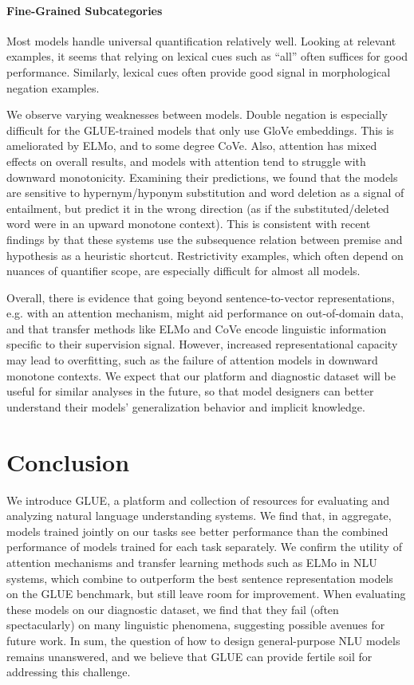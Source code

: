 \paragraph{Fine-Grained Subcategories}

Most models handle universal quantification relatively well.
Looking at relevant examples, it seems that relying on lexical cues such as ``all'' often suffices for good performance.
Similarly, lexical cues often provide good signal in morphological negation examples.

We observe varying weaknesses between models.
Double negation is especially difficult for the GLUE-trained models that only use GloVe embeddings. 
This is ameliorated by ELMo, and to some degree CoVe.
Also, attention has mixed effects on overall results, and models with attention tend to struggle with downward monotonicity.
Examining their predictions, we found that the models are sensitive to hypernym/hyponym substitution and word deletion as a signal of entailment, but predict it in the wrong direction (as if the substituted/deleted word were in an upward monotone context).
This is consistent with recent findings by \citet{mccoy2019subsequence} that these systems use the subsequence relation between premise and hypothesis as a heuristic shortcut.
Restrictivity examples, which often depend on nuances of quantifier scope, are especially difficult for almost all models.

Overall, there is evidence that going beyond sentence-to-vector representations, e.g. with an attention mechanism, might aid performance on out-of-domain data, and that transfer methods like ELMo and CoVe encode linguistic information specific to their supervision signal.
However, increased representational capacity may lead to overfitting, such as the failure of attention models in downward monotone contexts.
We expect that our platform and diagnostic dataset will be useful for similar analyses in the future, so that model designers can better understand their models' generalization behavior and implicit knowledge. 

\section{Conclusion}\label{sec:conclusion}

We introduce GLUE, 
a platform and collection of resources for evaluating and analyzing natural language understanding systems. 
We find that, in aggregate, models trained jointly on our tasks see better performance than the combined performance of models trained for each task separately.
We confirm the utility of attention mechanisms and transfer learning methods such as ELMo in NLU systems, which combine to outperform the best sentence representation models on the GLUE benchmark, but still leave room for improvement.
When evaluating these models on our diagnostic dataset, we find that they fail (often spectacularly) on many linguistic phenomena, suggesting possible avenues for future work.
In sum, the question of how to design general-purpose NLU models remains unanswered, and we believe that GLUE can provide fertile soil for addressing this challenge.

